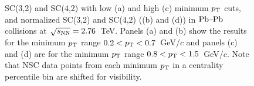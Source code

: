 \begin{figure}
\begin{center}
        \caption{SC(3,2) and SC(4,2) with low (a) and high (c) minimum $p_{\rm T}$ cuts, and normalized SC(3,2) and SC(4,2) ((b) and (d)) in $\textnormal{Pb--Pb}$ collisions at $\sqrt{s_{\textnormal{NN}}}=2.76$~TeV. Panels (a) and (b) show the results for the minimum $p_{\rm T}$ range $0.2<p_{\rm T}<0.7$~GeV/$c$ and panels (c) and (d) are for the minimum $p_{\rm T}$ range $0.8<p_{\rm T}<1.5$~GeV/$c$. Note that NSC data points from each minimum $p_{\rm T}$ in a centrality percentile bin are shifted for visibility.}
        \label{fig:Figure_2}
        \end{center}   
\end{figure}

